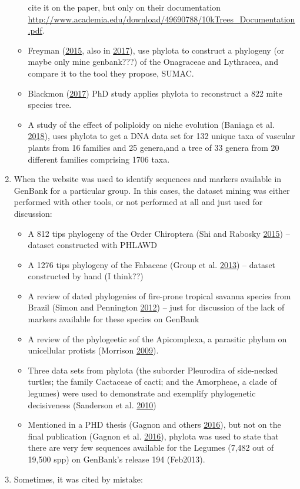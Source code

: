\documentclass[]{article}
\providecommand{\tightlist}{%
  \setlength{\itemsep}{0pt}\setlength{\parskip}{0pt}}
\begin{document}
\begin{enumerate}
\begin{itemize}
    cite it on the paper, but only on their documentation \url{http://www.academia.edu/download/49690788/10kTrees_Documentation.pdf}.
  \item
    Freyman (\protect\hyperlink{ref-freyman2015sumac}{2015}, also in \protect\hyperlink{ref-freyman2017phylogenetic}{2017}), use phylota to construct
    a phylogeny (or maybe only mine genbank???) of the Onagraceae and Lythracea,
    and compare it to the tool they propose, SUMAC.
  \item
    Blackmon (\protect\hyperlink{ref-blackmon2017synthesis}{2017}) PhD study applies phylota to reconstruct a 822 mite
    species tree.
  \item
    A study of the effect of poliploidy on niche evolution (Baniaga et al. \protect\hyperlink{ref-baniaga2018polyploid}{2018}),
    uses phylota to get a DNA data set for 132 unique taxa of vascular plants from
    16 families and 25 genera,and a tree of 33 genera from 20 different families
    comprising 1706 taxa.
  \end{itemize}
\item
  When the website was used to identify sequences and markers available in
  GenBank for a particular group. In this cases, the dataset mining was either performed
  with other tools, or not performed at all and just used for discussion:

  \begin{itemize}
  \tightlist
  \item
    A 812 tips phylogeny of the Order Chiroptera (Shi and Rabosky \protect\hyperlink{ref-shi2015speciation}{2015}) -- dataset
    constructed with PHLAWD
  \item
    A 1276 tips phylogeny of the Fabaceae (Group et al. \protect\hyperlink{ref-legume2013legume}{2013}) -- dataset constructed
    by hand (I think??)
  \item
    A review of dated phylogenies of fire-prone tropical savanna species from Brazil
    (Simon and Pennington \protect\hyperlink{ref-simon2012cerrado}{2012}) -- just for discussion of the lack of markers available for
    these species on GenBank
  \item
    A review of the phylogeetic sof the Apicomplexa, a parasitic phylum on unicellular
    protists (Morrison \protect\hyperlink{ref-morrison2009apicomplexa}{2009}).
  \item
    Three data sets from phylota (the suborder Pleurodira of side-necked turtles;
    the family Cactaceae of cacti; and the Amorpheae, a clade of legumes) were used
    to demonstrate and exemplify phylogenetic decisiveness (Sanderson et al. \protect\hyperlink{ref-sanderson2010phylogenomics}{2010})
  \item
    Mentioned in a PHD thesis (Gagnon and others \protect\hyperlink{ref-gagnon2016systematique}{2016}), but not on the final publication (Gagnon et al. \protect\hyperlink{ref-gagnon2016new}{2016}),
    phylota was used to state that there are very few sequences available for the Legumes (7,482 out of 19,500 spp) on GenBank's release 194 (Feb2013).
  \end{itemize}
\item
  Sometimes, it was cited by mistake:


\end{enumerate}
\end{document}

